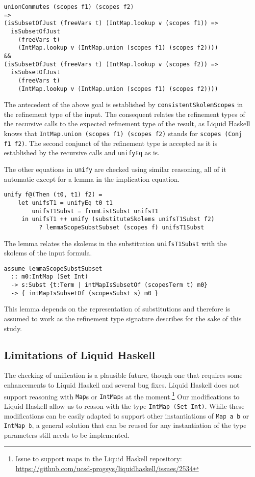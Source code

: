 \documentclass[acmtog, anonymous]{acmart}
\newcommand{\tc}[1]{{\small\texttt{#1}}}
\begin{document}
\begin{verbatim}
unionCommutes (scopes f1) (scopes f2)
=>
(isSubsetOfJust (freeVars t) (IntMap.lookup v (scopes f1)) =>
  isSubsetOfJust
    (freeVars t)
    (IntMap.lookup v (IntMap.union (scopes f1) (scopes f2))))
&&
(isSubsetOfJust (freeVars t) (IntMap.lookup v (scopes f2)) =>
  isSubsetOfJust
    (freeVars t)
    (IntMap.lookup v (IntMap.union (scopes f1) (scopes f2))))
\end{verbatim}

The antecedent of the above goal is established by \tc{consistent\-Skolem\-Scopes}
in the refinement type of the input. The consequent relates the refinement types
of the recursive calls to the expected refinement type of the result, as Liquid
Haskell knows that \tc{IntMap.\allowbreak union (scopes f1) (scopes f2)} stands for
\tc{scopes (Conj f1 f2)}. The second conjunct of the refinement type
is accepted as it is established by the recursive calls and \tc{unifyEq}
as is.

The other equations in \tc{unify} are checked using similar reasoning, all of it
automatic except for a lemma in the implication equation.

\begin{verbatim}
unify f@(Then (t0, t1) f2) =
    let unifsT1 = unifyEq t0 t1
        unifsT1Subst = fromListSubst unifsT1
     in unifsT1 ++ unify (substituteSkolems unifsT1Subst f2)
          ? lemmaScopeSubstSubset (scopes f) unifsT1Subst
\end{verbatim}

The lemma relates the skolems in the substitution \tc{unifsT1Subst}
with the skolems of the input formula.

\begin{verbatim}
assume lemmaScopeSubstSubset
  :: m0:IntMap (Set Int)
  -> s:Subst {t:Term | intMapIsSubsetOf (scopesTerm t) m0}
  -> { intMapIsSubsetOf (scopesSubst s) m0 }
\end{verbatim}

This lemma depends on the representation of substitutions and therefore is
assumed to work as the refinement type signature describes for the sake of
this study.


\subsection{Limitations of Liquid Haskell}
\label{limitations-of-liquid-haskell}

The checking of unification is a plausible future, though one that requires
some enhancements to Liquid Haskell and several bug fixes. Liquid Haskell does
not support reasoning with \tc{Map}s or \tc{IntMap}s at the
moment.\footnote{Issue to support maps in the Liquid Haskell repository: \url{https://github.com/ucsd-progsys/liquidhaskell/issues/2534}} Our
modifications to Liquid Haskell allow us to reason with the type
\tc{IntMap (Set Int)}. While these modifications can be easily adapted to
support other instantiations of \tc{Map a b} or \tc{IntMap b}, a general
solution that can be reused for any instantiation of the type parameters still
needs to be implemented.
\end{document}
